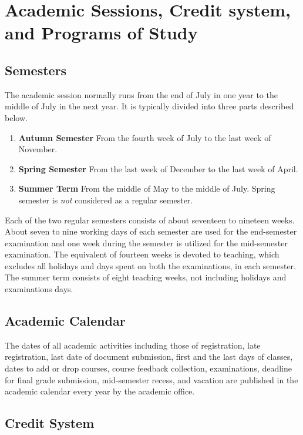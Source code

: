 

\section{Academic Sessions, Credit system, and Programs of Study}

\subsection{Semesters \label{lab:Semester}}

The academic session normally runs from the end of July in one year to the middle of July in the next year. It is typically divided into three parts described below.

\begin{enumerate}[leftmargin=15mm]
	\item \textbf{Autumn Semester}{} From the fourth week of July to the last week of November.
	\item \textbf{Spring Semester}{} From the last week of December to the last week of April.
	\item \textbf{Summer Term}{} From the middle of May to the middle of July. Spring semester is \textit{not} considered as a regular semester.
\end{enumerate}

Each of the two regular semesters consists of about seventeen to nineteen weeks. About seven to nine working days of each semester are used for the end-semester examination and one week during the semester is utilized for the mid-semester examination. The equivalent of fourteen weeks is devoted to teaching, which excludes all holidays and days spent on both the examinations, in each semester. The summer term consists of eight teaching weeks, not including holidays and examinations days.

\subsection{Academic Calendar \label{lab:Academic Calendar}}

The dates of all academic activities including those of registration, late registration, last date of document submission, first and the last days of classes, dates to add or drop courses, course feedback collection, examinations, deadline for final grade submission, mid-semester recess, and vacation are published in the academic calendar every year by the academic office.

\subsection{Credit System \label{lab:Credit System}}

